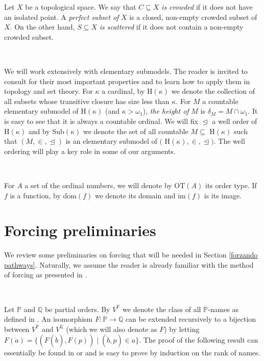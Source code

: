 \documentclass{article}%
\begin{document}
\qquad\qquad\qquad

Let $X$ be a topological space. We say that $C\subseteq X$ \emph{is crowded
}if it does not have an isolated point. A \emph{perfect subset of} $X$ is a
closed, non-empty crowded subset of $X.$ On the other hand, $S\subseteq X$
\emph{is scattered }if it does not contain a non-empty crowded subset.

\qquad\qquad\qquad\ \ 

We will work extensively with elementary submodels. The reader is invited to
consult \cite{AlanSubmodelos} for their most important properties and to learn
how to apply them in topology and set theory. For $\kappa$ a cardinal, by
\textsf{H}$\left(  \kappa\right)  $ we denote the collection of all subsets
whose transitive closure has size less than $\kappa.$ For $M$ a countable
elementary submodel of \textsf{H}$\left(  \kappa\right)  $ (and $\kappa
>\omega_{1}$), \emph{the height of }$M$ is $\delta_{M}=M\cap\omega_{1}.$ It is
easy to see that it is always a countable ordinal. We will fix
$\trianglelefteq$ a well order of \textsf{H}$\left(  \kappa\right)  $ and by
\textsf{Sub}$\left(  \kappa\right)  $ we denote the set of all countable
$M\subseteq$ \textsf{H}$\left(  \kappa\right)  $ such that $\left(
M,\in,\trianglelefteq\right)  $ is an elementary submodel of $($%
\textsf{H}$\left(  \kappa\right)  ,\in,\trianglelefteq).$ The well ordering
will play a key role in some of our arguments.

\qquad\ \ \ 

For $A$ a set of the ordinal numbers, we will denote by \textsf{OT}$\left(
A\right)  $ its order type. If $f$ is a function, by \textsf{dom}$\left(
f\right)  $ we denote its domain and \textsf{im}$\left(  f\right)  $ is its image.

\section{Forcing preliminaries \label{Preliminares Forcing}}

We review some preliminaries on forcing that will be needed in Section
\ref{forzando pathways}. Naturally, we assume the reader is already familiar
with the method of forcing as presented in \cite{oldKunen}.

\qquad\ \ \ 

Let $\mathbb{P}$ and $\mathbb{Q}$ be partial orders. By $V^{\mathbb{P}}$ we
denote the class of all $\mathbb{P}$-names as defined in \cite{oldKunen}. An
isomorphism $F:\mathbb{P\longrightarrow Q}$ can be extended recursively to a
bijection between $V^{\mathbb{P}}$ and $V^{\mathbb{Q}}$ (which we will also
denote as $F$) by letting $F\left(  \dot{a}\right)  =\{(F(\dot{b}),F\left(
p\right)  )\mid(\dot{b},p)\in\dot{a}\}.$ The proof of the following result can
essentially be found in \cite{Jech} or \cite{JechAC} and is easy to prove by
induction on the rank of names.
\end{document}
